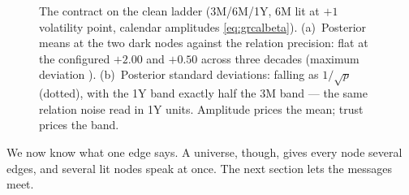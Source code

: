 \begin{figure}[htbp]
\centering
{}
\caption{The contract on the clean ladder (3M/6M/1Y, 6M lit at $+1$
volatility point, calendar amplitudes \cref{eq:grcalbeta}).
(a)~Posterior means at the two dark nodes against the relation
precision: flat at the configured $+2.00$ and $+0.50$ across three
decades (maximum deviation \MacGrContractFlat).  (b)~Posterior
standard deviations: falling as $1/\sqrt{p}$ (dotted), with the 1Y
band exactly half the 3M band --- the same relation noise read in
1Y units.  Amplitude prices the mean; trust prices the band.}
\label{fig:grcontract}
\end{figure}

We now know what one edge says.  A universe, though, gives every node
several edges, and several lit nodes speak at once.  The next section
lets the messages meet.
